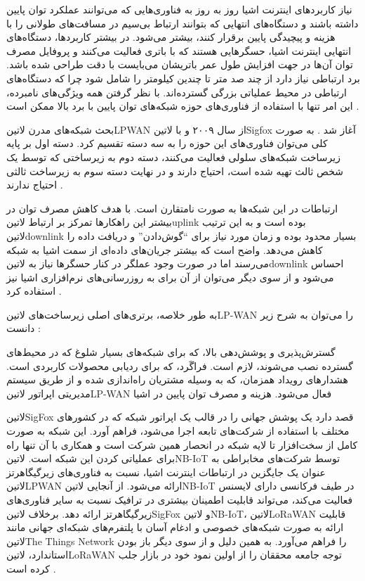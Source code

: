 
نیاز کاربردهای اینترنت اشیا روز به روز به فناوری‌هایی که می‌توانند عملکرد توان پایین داشته باشند
و دستگاه‌های انتهایی که بتوانند ارتباط بی‌سیم در مسافت‌های طولانی را با هزینه و پیچیدگی پایین برقرار کنند، بیشتر می‌شود.
در بیشتر کاربردها، دستگاه‌های انتهایی اینترنت اشیا، حسگرهایی هستند که با باتری فعالیت می‌کنند و پروفایل مصرف توان آن‌ها در جهت افزایش طول عمر
باتریشان می‌بایست با دقت طراحی شده باشد.
برد ارتباطی نیاز دارد از چند صد متر تا چندین کیلومتر را شامل شود چرا که دستگاه‌های ارتباطی در محیط عملیاتی بزرگی گسترده‌اند.
با نظر گرفتن همه ویژگی‌های نامبرده، این امر تنها با استفاده از فناوری‌های حوزه شبکه‌های توان پایین با برد بالا ممکن است
.

بحث شبکه‌های مدرن ‌لاتین{LPWAN} از سال ۲۰۰۹ و با ‌لاتین{Sigfox} آغاز شد .
به صورت کلی می‌توان فناوری‌های این حوزه را به سه دسته تقسیم کرد. دسته اول بر پایه زیرساخت شبکه‌های سلولی فعالیت می‌کنند،
دسته دوم به زیرساختی که توسط یک شخص ثالث تهیه شده است، احتیاج دارند و در نهایت دسته سوم به زیرساخت ثالثی احتیاج ندارند
.

ارتباطات در این شبکه‌ها به صورت نامتقارن است. با هدف کاهش مصرف توان در بیشتر این راهکارها تمرکز بر ارتباط ‌لاتین{uplink}
بوده است و به این ترتیب ‌لاتین{downlink} بسیار محدود بوده و زمان مورد نیاز برای ``گوش‌دادن'' و دریافت داده را کاهش می‌دهد.
واضح است که بیشتر جریان‌های داده‌ای از سمت اشیا به شبکه می‌رسند اما در صورت وجود عملگر در کنار حسگرها نیاز به ‌لاتین{downlink}
احساس می‌شود و از سوی دیگر می‌توان از آن برای به روزرسانی‌های نرم‌افزاری اشیا نیز استفاده کرد
.

به طور خلاصه، برتری‌های اصلی زیرساخت‌های ‌لاتین{LP-WAN} را می‌توان به شرح زیر دانست :

 گسترش‌پذیری و پوشش‌دهی بالا، که برای شبکه‌های بسیار شلوغ که در محیط‌های گسترده نصب می‌شوند، لازم است.
 فراگَرد، که برای ردیابی محصولات کاربردی است.
 هشدارهای رویداد همزمان، که به وسیله مشتریان راه‌اندازی شده و از طریق سیستم مدیریتی اپراتور ‌لاتین{LP-WAN} فعال می‌شود.
 هزینه و مصرف توان پایین در اشیا

‌لاتین{SigFox} قصد دارد یک پوشش جهانی را در قالب یک اپراتور شبکه که در کشورهای مختلف با استفاده از شرکت‌های تابعه اجرا می‌شود، فراهم آورد.
این شبکه به صورت کامل از سخت‌افزار تا لایه شبکه در انحصار همین شرکت است و همکاری با آن تنها راه برای عملیاتی کردن این شبکه است.
‌لاتین{NB-IoT} توسط شرکت‌های مخابراطی به عنوان یک جایگزین در ارتباطات اینترنت اشیا، نسبت به فناوری‌های زیرگیگاهرتز ‌لاتین{LPWAN} ارائه می‌شود.
از آنجایی ‌لاتین{NB-IoT} در طیف فرکانسی دارای لایسنس فعالیت می‌کند، می‌تواند قابلیت اطمینان بیشتری در ترافیک نسبت به سایر فناوری‌های زیرگیگاهرتز ارائه دهد.
برخلاف ‌لاتین{SigFox} و ‌لاتین{NB-IoT}، ‌لاتین{LoRaWAN} قابلیت ارائه به صورت شبکه‌های خصوصی و ادغام آسان با پلتفرم‌های شبکه‌ای جهانی مانند ‌لاتین{The Things Network} را فراهم می‌آورد.
به همین دلیل و از سوی دیگر باز بودن استاندارد، ‌لاتین{LoRaWAN} توجه جامعه محققان را از اولین نمود خود در بازار جلب کرده است
.

